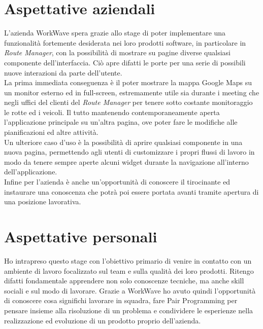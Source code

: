 \section{Aspettative aziendali}

L'azienda WorkWave spera grazie allo stage di poter implementare una funzionalità fortemente desiderata nei loro prodotti software, in particolare in \textit{Route Manager}, con la possibilità di mostrare su pagine diverse qualsiasi componente dell'interfaccia. Ciò apre difatti le porte per una serie di possibili nuove interazioni da parte dell'utente. \\

La prima immediata conseguenza è il poter mostrare la mappa Google Maps su un monitor esterno ed in full-screen, estremamente utile sia durante i meeting che negli uffici del clienti del \textit{Route Manager} per tenere sotto costante monitoraggio le rotte ed i veicoli. Il tutto mantenendo contemporaneamente aperta l'applicazione principale su un'altra pagina, ove poter fare le modifiche alle pianificazioni ed altre attività. \\

Un ulteriore caso d'uso è la possibilità di aprire qualsiasi componente in una nuova pagina, permettendo agli utenti di customizzare i propri flussi di lavoro in modo da tenere sempre aperte alcuni widget durante la navigazione all'interno dell'applicazione. \\

Infine per l'azienda è anche un'opportunità di conoscere il tirocinante ed instaurare una conoscenza che potrà poi essere portata avanti tramite apertura di una posizione lavorativa. 

\section{Aspettative personali}

Ho intrapreso questo stage con l'obiettivo primario di venire in contatto con un ambiente di lavoro focalizzato sul team e sulla qualità dei loro prodotti. Ritengo difatti fondamentale apprendere non solo conoscenze tecniche, ma anche skill sociali e sul modo di lavorare. Grazie a WorkWave ho avuto quindi l'opportunità di conoscere cosa significhi lavorare in squadra, fare \gls{Pair Programming} per pensare insieme alla risoluzione di un problema e condividere le esperienze nella realizzazione ed evoluzione di un prodotto proprio dell'azienda. \\

